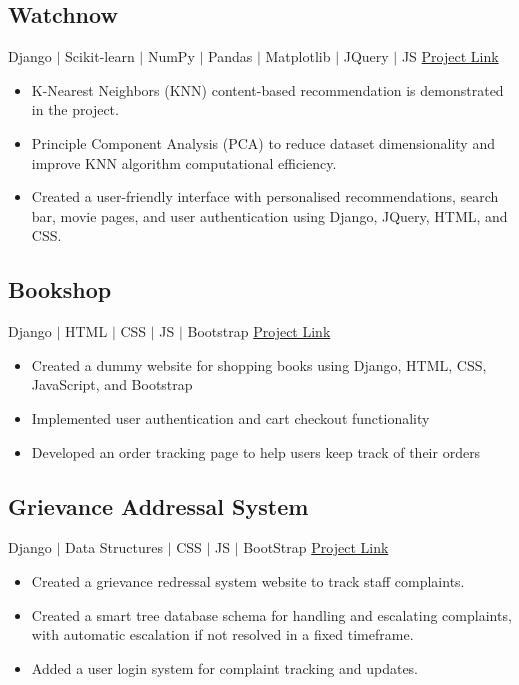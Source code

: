 \documentclass[12pt]{article}
\begin{document}
\subsection*{Watchnow} \quad Django $|$ Scikit-learn $|$ NumPy $|$ Pandas $|$ Matplotlib $|$ JQuery $|$ JS \hfill \href{https://github.com/prabhavagrawal7/watchnow/}{Project Link}\\
\begin{itemize}[topsep=0.5pt,itemsep=0pt,partopsep=1pt, parsep=0pt]
	\item K-Nearest Neighbors (KNN) content-based recommendation is demonstrated in the project.
	\item Principle Component Analysis (PCA) to reduce dataset dimensionality and improve KNN algorithm computational efficiency.
	\item Created a user-friendly interface with personalised recommendations, search bar, movie pages, and user authentication using Django, JQuery, HTML, and CSS.
\end{itemize}

\subsection*{Bookshop} \quad Django $|$ HTML $|$ CSS $|$ JS $|$ Bootstrap \hfill \href{https://github.com/prabhavagrawal7/bookshop}{Project Link} \\ 
\begin{itemize}[topsep=0.5pt,itemsep=0pt,partopsep=1pt, parsep=0pt]
	\item Created a dummy website for shopping books using Django, HTML, CSS, JavaScript, and Bootstrap
	\item Implemented user authentication and cart checkout functionality
	\item Developed an order tracking page to help users keep track of their orders
\end{itemize}

\subsection*{Grievance Addressal System} \quad Django $|$ Data Structures $|$ CSS $|$ JS $|$ BootStrap \hfill \href{https://github.com/prabhavagrawal7/grievance-addressal-system}{Project Link}\\
\begin{itemize}[topsep=0.5pt,itemsep=0pt,partopsep=1pt, parsep=0pt]
	\item Created a grievance redressal system website to track staff complaints.
	\item Created a smart tree database schema for handling and escalating complaints, with automatic escalation if not resolved in a fixed timeframe.
	\item Added a user login system for complaint tracking and updates.
\end{itemize}
\end{document}
